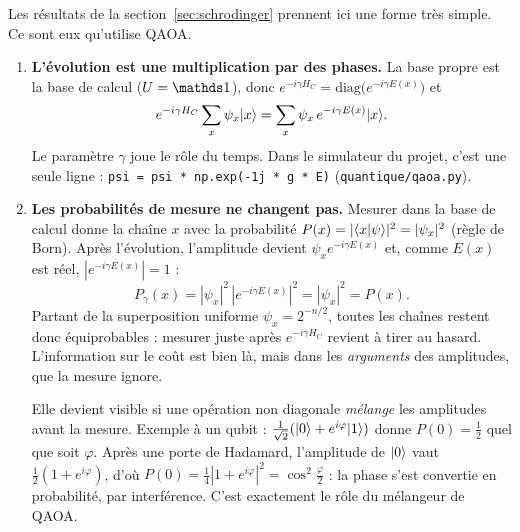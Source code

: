 Les résultats de la section~\ref{sec:schrodinger} prennent ici une forme très simple. Ce sont eux qu'utilise QAOA.
\begin{enumerate}
\item \textbf{L'évolution est une multiplication par des phases.} La base propre est la base de calcul ($U=\Id$), donc $e^{-i\gamma H_C}=\mathrm{diag}\big(e^{-i\gamma E(x)}\big)$ et
\[ e^{-i\gamma H_C}\sum_x\psi_x\lvert x\rangle=\sum_x\psi_x\,e^{-i\gamma E(x)}\lvert x\rangle. \]
Le paramètre $\gamma$ joue le rôle du temps. Dans le simulateur du projet, c'est une seule ligne : \texttt{psi = psi * np.exp(-1j * g * E)} (\texttt{quantique/qaoa.py}).
\item \textbf{Les probabilités de mesure ne changent pas.} Mesurer dans la base de calcul donne la chaîne $x$ avec la probabilité $P(x)=|\langle x\vert \psi\rangle|^2=|\psi_x|^2$ (règle de Born). Après l'évolution, l'amplitude devient $\psi_xe^{-i\gamma E(x)}$ et, comme $E(x)$ est réel, $|e^{-i\gamma E(x)}|=1$ :
\[ P_\gamma(x)=|\psi_x|^2\,|e^{-i\gamma E(x)}|^2=|\psi_x|^2=P(x). \]
Partant de la superposition uniforme $\psi_x=2^{-n/2}$, toutes les chaînes restent donc équiprobables : mesurer juste après $e^{-i\gamma H_C}$ revient à tirer au hasard. L'information sur le coût est bien là, mais dans les \emph{arguments} des amplitudes, que la mesure ignore.

\smallskip
Elle devient visible si une opération non diagonale \emph{mélange} les amplitudes avant la mesure. Exemple à un qubit : $\tfrac1{\sqrt2}(\lvert 0\rangle+e^{i\varphi}\lvert 1\rangle)$ donne $P(0)=\tfrac12$ quel que soit $\varphi$. Après une porte de Hadamard, l'amplitude de $\lvert 0\rangle$ vaut $\tfrac12(1+e^{i\varphi})$, d'où $P(0)=\tfrac14|1+e^{i\varphi}|^2=\cos^2\tfrac\varphi2$ : la phase s'est convertie en probabilité, par interférence. C'est exactement le rôle du mélangeur de QAOA.


\end{enumerate}
